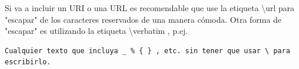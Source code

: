 Si va a incluir un URI o una URL es recomendable que use la etiqueta \textbackslash url para "escapar" de los caracteres reservados de una manera cómoda. Otra forma de "escapar" es utilizando la etiqueta \textbackslash verbatim , p.ej. 

\begin{verbatim}
Cualquier texto que incluya _ % { } , etc. sin tener que usar \ para escribirlo.
\end{verbatim}






